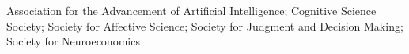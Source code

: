 
\begin{cvparagraph}
Association for the Advancement of Artificial Intelligence;
Cognitive Science Society;
Society for Affective Science;
Society for Judgment and Decision Making;
Society for Neuroeconomics
\end{cvparagraph}